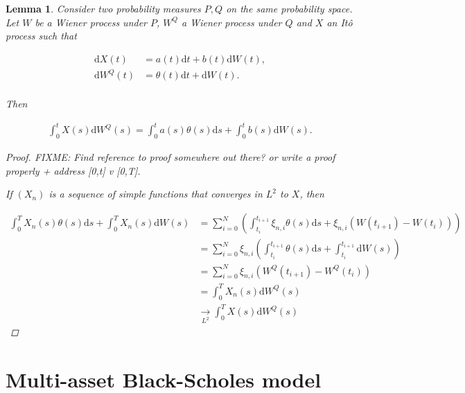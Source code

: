 \documentclass[a4paper]{article}
\newtheorem{lemma}[definition]{Lemma}
\begin{document}
\begin{lemma}\label{lem:ito-integral-girsanov}
  Consider two probability measures $P, Q$ on the same probability space. Let $W$ be a Wiener process under $P$, $W^Q$ a Wiener process under $Q$ and $X$ an It\^o process such that

  \begin{align*}
    \mathrm{d}X(t) &= a(t) \mathrm{d}t + b(t) \mathrm{d}W(t),\\
    \mathrm{d}W^Q(t) &= \theta(t) \mathrm{d}t + \mathrm{d}W(t).\\
  \end{align*}

  Then

  \begin{align*}
    \int_0^t X(s) \mathrm{d}W^Q(s) = \int_0^t a(s) \theta(s) \mathrm{d}s + \int_0^t b(s) \mathrm{d}W(s).
  \end{align*}

  \begin{proof}
    FIXME: Find reference to proof somewhere out there? or write a proof properly + address [0,t] v [0,T].

    If $(X_n)$ is a sequence of simple functions that converges in $L^2$ to $X$, then

    \begin{align*}
      \int_0^T X_n(s) \theta(s) \mathrm{d}s + \int_0^T X_n(s) \mathrm{d}W(s)
      &= \sum_{i=0}^N \left( \int_{t_i}^{t_{i+1}} \xi_{n,i} \theta(s) \mathrm{d}s + \xi_{n,i} (W(t_{i+1}) - W(t_i)) \right)\\
      &= \sum_{i=0}^N \xi_{n,i} \left( \int_{t_i}^{t_{i+1}} \theta(s) \mathrm{d}s + \int_{t_i}^{t_{i+1}} \mathrm{d}W(s) \right)\\
      &= \sum_{i=0}^N \xi_{n,i} (W^Q(t_{i+1}) - W^Q(t_i))\\
      &= \int_0^T X_n(s) \mathrm{d}W^Q(s)\\
      &\underset{L^2}{\longrightarrow} \int_0^T X(s) \mathrm{d}W^Q(s)
    \end{align*}
  \end{proof}
\end{lemma}

\pagebreak
\section{Multi-asset Black-Scholes model}

\end{document}
